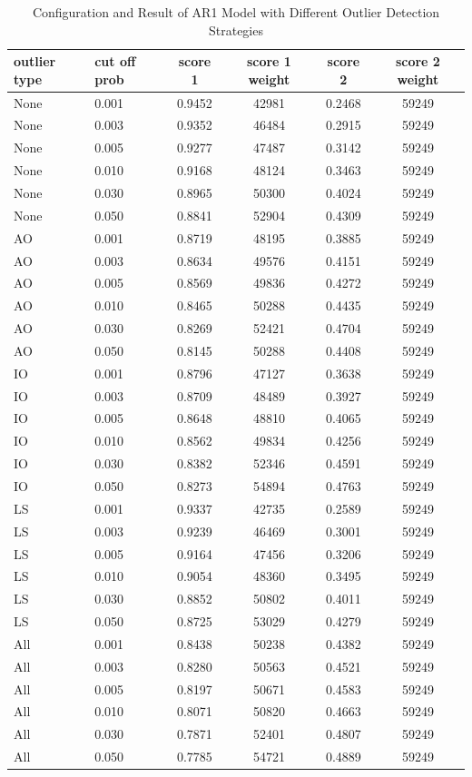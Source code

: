 \documentclass{article}
\begin{document}
\begin{longtable}[htbp]{l|l|*{4}{c}}
    \caption{Configuration and Result of AR1 Model with Different Outlier Detection Strategies}
    \label{tab:tab1.3.3}\\
    \textbf{outlier type} & \textbf{cut off prob} & \textbf{score 1} &
    \textbf{score 1 weight} & \textbf{score 2} & \textbf{score 2 weight} \\
    \hline
    None & 0.001 & 0.9452 & 42981 & 0.2468 & 59249\\
    None & 0.003 & 0.9352 & 46484 & 0.2915 & 59249\\
    None & 0.005 & 0.9277 & 47487 & 0.3142 & 59249\\
    None & 0.010 & 0.9168 & 48124 & 0.3463 & 59249\\
    None & 0.030 & 0.8965 & 50300 & 0.4024 & 59249\\
    None & 0.050 & 0.8841 & 52904 & 0.4309 & 59249\\
    AO & 0.001 & 0.8719 & 48195 & 0.3885 & 59249\\
    AO & 0.003 & 0.8634 & 49576 & 0.4151 & 59249\\
    AO & 0.005 & 0.8569 & 49836 & 0.4272 & 59249\\
    AO & 0.010 & 0.8465 & 50288 & 0.4435 & 59249\\
    AO & 0.030 & 0.8269 & 52421 & 0.4704 & 59249\\
    AO & 0.050 & 0.8145 & 50288 & 0.4408 & 59249\\
    IO & 0.001 & 0.8796 & 47127 & 0.3638 & 59249\\
    IO & 0.003 & 0.8709 & 48489 & 0.3927 & 59249\\
    IO & 0.005 & 0.8648 & 48810 & 0.4065 & 59249\\
    IO & 0.010 & 0.8562 & 49834 & 0.4256 & 59249\\
    IO & 0.030 & 0.8382 & 52346 & 0.4591 & 59249\\
    IO & 0.050 & 0.8273 & 54894 & 0.4763 & 59249\\
    LS & 0.001 & 0.9337 & 42735 & 0.2589 & 59249\\
    LS & 0.003 & 0.9239 & 46469 & 0.3001 & 59249\\
    LS & 0.005 & 0.9164 & 47456 & 0.3206 & 59249\\
    LS & 0.010 & 0.9054 & 48360 & 0.3495 & 59249\\
    LS & 0.030 & 0.8852 & 50802 & 0.4011 & 59249\\
    LS & 0.050 & 0.8725 & 53029 & 0.4279 & 59249\\
    All & 0.001 & 0.8438 & 50238 & 0.4382 & 59249\\
    All & 0.003 & 0.8280 & 50563 & 0.4521 & 59249\\
    All & 0.005 & 0.8197 & 50671 & 0.4583 & 59249\\
    All & 0.010 & 0.8071 & 50820 & 0.4663 & 59249\\
    All & 0.030 & 0.7871 & 52401 & 0.4807 & 59249\\
    All & 0.050 & 0.7785 & 54721 & 0.4889 & 59249\\
\end{longtable}
\end{document}
